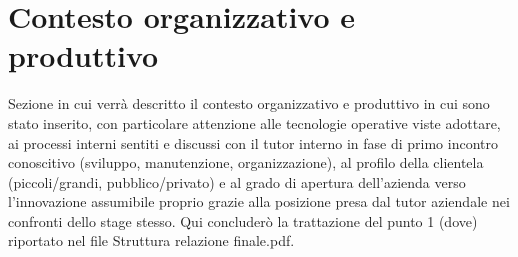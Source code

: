 \section{Contesto organizzativo e produttivo}

Sezione in cui verrà descritto il contesto organizzativo e produttivo in cui sono stato inserito, con particolare attenzione alle tecnologie operative viste adottare, ai processi interni sentiti e discussi con il tutor interno in fase di primo incontro conoscitivo (sviluppo, manutenzione, organizzazione), al profilo della clientela (piccoli/grandi, pubblico/privato) e al grado di apertura dell’azienda verso l’innovazione assumibile proprio grazie alla posizione presa dal tutor aziendale nei confronti dello stage stesso. 
Qui concluderò la trattazione del punto 1 (dove) riportato nel file Struttura relazione finale.pdf.